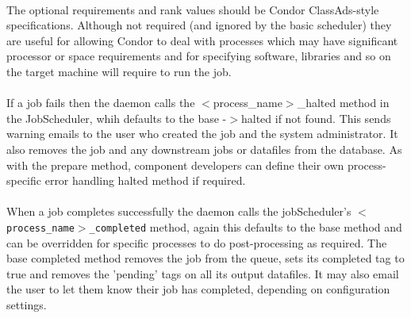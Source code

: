 \paragraph{}
The optional requirements and rank values should be Condor ClassAds-style \citep{raman:98} specifications. Although not required (and ignored by the basic scheduler) they are useful for allowing Condor to deal with processes which may have significant processor or space requirements and for specifying software, libraries and so on the target machine will require to run the job.

\paragraph{}
If a job fails then the daemon calls the $<$process\_name$>$\_halted method in the JobScheduler, whih defaults to the base -$>$halted if not found. This sends warning emails to the user who created the job and the system administrator. It also removes the job and any downstream jobs or datafiles from the database. As with the prepare method, component developers can define their own process-specific error handling halted method if required.

\paragraph{}
When a job completes successfully the daemon calls the jobScheduler's \texttt{$<$process\_name$>$\_completed} method, again this defaults to the base method and can be overridden for specific processes to do post-processing as required. The base completed method removes the job from the queue, sets its completed tag to true and removes the 'pending' tags on all its output datafiles. It may also email the user to let them know their job has completed, depending on configuration settings.

